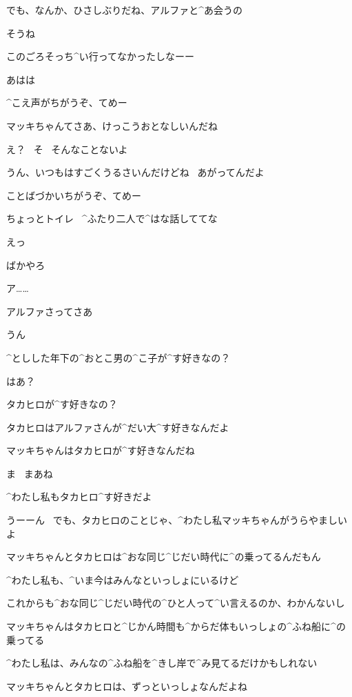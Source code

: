 \Takahiro でも、なんか、ひさしぶりだね、アルファと^{あ}{会}うの

\Alpha そうね

\Takahiro このごろそっち^{い}{行}ってなかったしなーー

\Takahiro あはは

\Makki ^{こえ}{声}がちがうぞ、てめー

\page
\Alpha マッキちゃんてさあ、けっこうおとなしいんだね

\Makki え？
\ そ
\ そんなことないよ

\Takahiro うん、いつもはすごくうるさいんだけどね
\ あがってんだよ

\Makki ことばづかいちがうぞ、てめー

\Takahiro ちょっとトイレ
\ ^{ふたり}{二人}で^{はな}{話}しててな

\Makki えっ

\Makki ばかやろ

\page
\Makki ア……

\Makki アルファさってさあ

\Alpha うん

\Makki ^{としした}{年下}の^{おとこ}{男}の^{こ}{子}が^{す}{好}きなの？

\Alpha はあ？

\page
\Makki タカヒロが^{す}{好}きなの？

\Makki タカヒロはアルファさんが^{だい}{大}^{す}{好}きなんだよ

\Alpha マッキちゃんはタカヒロが^{す}{好}きなんだね

\Makki ま
\ まあね

\Alpha ^{わたし}{私}もタカヒロ^{す}{好}きだよ

\page
\Alpha うーーん
\ でも、タカヒロのことじゃ、^{わたし}{私}マッキちゃんがうらやましいよ

\Alpha マッキちゃんとタカヒロは^{おな}{同}じ^{じだい}{時代}に^{の}{乗}ってるんだもん

\Alpha ^{わたし}{私}も、^{いま}{今}はみんなといっしょにいるけど

\Alpha これからも^{おな}{同}じ^{じだい}{時代}の^{ひと}{人}って^{い}{言}えるのか、わかんないし

\Alpha マッキちゃんはタカヒロと^{じかん}{時間}も^{からだ}{体}もいっしょの^{ふね}{船}に^{の}{乗}ってる

\Alpha ^{わたし}{私}は、みんなの^{ふね}{船}を^{きし}{岸}で^{み}{見}てるだけかもしれない

\page
\Alpha マッキちゃんとタカヒロは、ずっといっしょなんだよね

